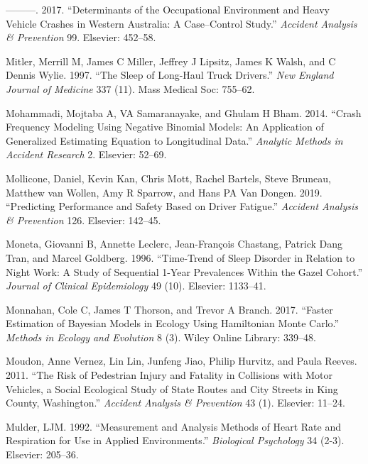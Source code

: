 \documentclass[12pt]{book}
\numberwithin{equation}{chapter}
\begin{document}
\leavevmode\hypertarget{ref-meuleners2017determinants}{}%
---------. 2017. ``Determinants of the Occupational Environment and Heavy Vehicle Crashes in Western Australia: A Case--Control Study.'' \emph{Accident Analysis \& Prevention} 99. Elsevier: 452--58.

\leavevmode\hypertarget{ref-mitler1997sleep}{}%
Mitler, Merrill M, James C Miller, Jeffrey J Lipsitz, James K Walsh, and C Dennis Wylie. 1997. ``The Sleep of Long-Haul Truck Drivers.'' \emph{New England Journal of Medicine} 337 (11). Mass Medical Soc: 755--62.

\leavevmode\hypertarget{ref-mohammadi2014crash}{}%
Mohammadi, Mojtaba A, VA Samaranayake, and Ghulam H Bham. 2014. ``Crash Frequency Modeling Using Negative Binomial Models: An Application of Generalized Estimating Equation to Longitudinal Data.'' \emph{Analytic Methods in Accident Research} 2. Elsevier: 52--69.

\leavevmode\hypertarget{ref-mollicone2019predicting}{}%
Mollicone, Daniel, Kevin Kan, Chris Mott, Rachel Bartels, Steve Bruneau, Matthew van Wollen, Amy R Sparrow, and Hans PA Van Dongen. 2019. ``Predicting Performance and Safety Based on Driver Fatigue.'' \emph{Accident Analysis \& Prevention} 126. Elsevier: 142--45.

\leavevmode\hypertarget{ref-moneta1996time}{}%
Moneta, Giovanni B, Annette Leclerc, Jean-François Chastang, Patrick Dang Tran, and Marcel Goldberg. 1996. ``Time-Trend of Sleep Disorder in Relation to Night Work: A Study of Sequential 1-Year Prevalences Within the Gazel Cohort.'' \emph{Journal of Clinical Epidemiology} 49 (10). Elsevier: 1133--41.

\leavevmode\hypertarget{ref-monnahan2017faster}{}%
Monnahan, Cole C, James T Thorson, and Trevor A Branch. 2017. ``Faster Estimation of Bayesian Models in Ecology Using Hamiltonian Monte Carlo.'' \emph{Methods in Ecology and Evolution} 8 (3). Wiley Online Library: 339--48.

\leavevmode\hypertarget{ref-moudon2011risk}{}%
Moudon, Anne Vernez, Lin Lin, Junfeng Jiao, Philip Hurvitz, and Paula Reeves. 2011. ``The Risk of Pedestrian Injury and Fatality in Collisions with Motor Vehicles, a Social Ecological Study of State Routes and City Streets in King County, Washington.'' \emph{Accident Analysis \& Prevention} 43 (1). Elsevier: 11--24.

\leavevmode\hypertarget{ref-mulder1992measurement}{}%
Mulder, LJM. 1992. ``Measurement and Analysis Methods of Heart Rate and Respiration for Use in Applied Environments.'' \emph{Biological Psychology} 34 (2-3). Elsevier: 205--36.
\end{document}
